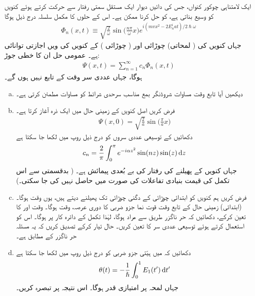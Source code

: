 ایک لامتناہی چوکور کنواں، جس کی دائیں دیوار ایک مستقل سمتی رفتار  سے حرکت کرتے ہوئے کنویں کو وسیع بناتی ہے، کو  حل کرنا ممکن ہے۔ اس کے حلوں کا مکمل سلسلہ درج ذیل ہوگا 
\begin{align}\label{مساوات_حر_مکمل_حل_چوکور_کنواں}
\Phi_n (x, t) \equiv \sqrt{\frac{2}{\omega}} \sin \big ( \frac{n \pi}{\omega} x \big ) e^{i(mvx^2 -2E_n^i at)/2\hslash \omega}
\end{align}
جہاں  کنویں کی ( لمحاتی) چوڑائی اور  ( چوڑائی ) کے  کنویں کی  ویں اجازتی توانائی ہے۔ عمومی حل ان  کا خطی جوڑ:
\begin{align}
\Psi (x, t) = \sum_{n = 1}^{\infty} c_n \Phi_n (x, t)
\end{align}
ہوگا، جہاں عددی سر  وقت  کے تابع نہیں ہوں گے۔
\begin{enumerate}[a.]
\item
دیکھیں آیا تابع وقت مساوات شروڈنگر بمع مناسب سرحدی شرائط کو مساوات  مطمئن کرتی ہے۔
\item
فرض کریں اصل کنویں کے زمینی حال میں ایک ذرہ آغاز  کرتا ہے۔
\begin{align*}
\Psi (x, 0) = \sqrt{\frac{2}{a}} \sin \big ( \frac{\pi}{a} x \big )
\end{align*}
دکھائیں کے توسیعی عددی سروں کو درج ذیل روپ میں لکھا جا سکتا ہے 
\begin{align}
c_n = \frac{2}{\pi} \int_0^{\pi} e^{-i\alpha z^2} \sin(nz) \sin(z) \dif z
\end{align}
جہاں  کنویں کے پھیلنے کی رفتار کی بے بُعدی پیمائش ہے۔ ( بدقسمتی سے اس تکمل کی قیمت بنیادی تفاعلات کی صورت میں حاصل نہیں کی جا سکتی۔) 
\item
فرض کریں ہم کنویں کو ابتدائی چوڑائی کے دگنی چوڑائی تک پھیلنے دیتے ہیں، یوں  وقت  ہوگا۔ (ابتدائی) زمینی حال کے تابع وقت قوت نما جزو ضربی کا دوری عرصہ،  وقت ہوگا۔ وقت  اور  کا تعین کرکے، دکھائیں کہ حر ناگزر طریق سے مراد  ہوگا، لہٰذا تکمل کے
 دائرہ کار پر  ہوگا۔ اس کو استعمال کرتے ہوئے توسیعی عددی سر  کا تعین کریں۔ حال  تیار کرکے تصدیق کریں کہ یہ مسئلہ حر ناگزر کے مطابق ہے۔
\item
دکھائیں کہ  میں ہیّتی جزو ضربی کو درج ذیل روپ میں لکھا جا سکتا ہے 
\begin{align}
\theta (t) = - \frac{1}{\hslash} \int_0^1 E_1 (t') \dif t'
\end{align}
جہاں لمحہ  پر  امتیازی قدر  ہوگا۔ اس نتیجہ پر تبصرہ کریں۔
\end{enumerate}
